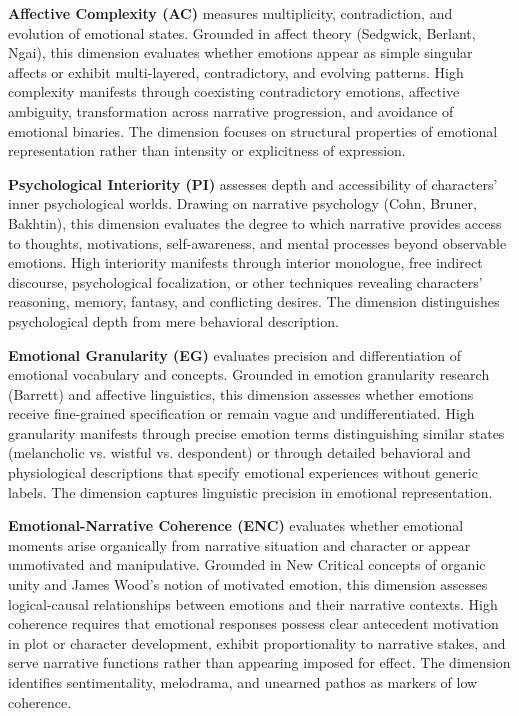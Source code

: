 \textbf{Affective Complexity (AC)} measures multiplicity, contradiction, and evolution of emotional states. Grounded in affect theory (Sedgwick, Berlant, Ngai), this dimension evaluates whether emotions appear as simple singular affects or exhibit multi-layered, contradictory, and evolving patterns. High complexity manifests through coexisting contradictory emotions, affective ambiguity, transformation across narrative progression, and avoidance of emotional binaries. The dimension focuses on structural properties of emotional representation rather than intensity or explicitness of expression.

\textbf{Psychological Interiority (PI)} assesses depth and accessibility of characters' inner psychological worlds. Drawing on narrative psychology (Cohn, Bruner, Bakhtin), this dimension evaluates the degree to which narrative provides access to thoughts, motivations, self-awareness, and mental processes beyond observable emotions. High interiority manifests through interior monologue, free indirect discourse, psychological focalization, or other techniques revealing characters' reasoning, memory, fantasy, and conflicting desires. The dimension distinguishes psychological depth from mere behavioral description.

\textbf{Emotional Granularity (EG)} evaluates precision and differentiation of emotional vocabulary and concepts. Grounded in emotion granularity research (Barrett) and affective linguistics, this dimension assesses whether emotions receive fine-grained specification or remain vague and undifferentiated. High granularity manifests through precise emotion terms distinguishing similar states (melancholic vs. wistful vs. despondent) or through detailed behavioral and physiological descriptions that specify emotional experiences without generic labels. The dimension captures linguistic precision in emotional representation.

\textbf{Emotional-Narrative Coherence (ENC)} evaluates whether emotional moments arise organically from narrative situation and character or appear unmotivated and manipulative. Grounded in New Critical concepts of organic unity and James Wood's notion of motivated emotion, this dimension assesses logical-causal relationships between emotions and their narrative contexts. High coherence requires that emotional responses possess clear antecedent motivation in plot or character development, exhibit proportionality to narrative stakes, and serve narrative functions rather than appearing imposed for effect. The dimension identifies sentimentality, melodrama, and unearned pathos as markers of low coherence.

